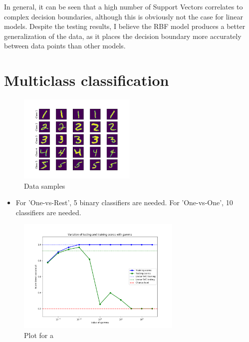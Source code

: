 \documentclass[a4paper]{article}
\begin{document}
In general, it can be seen that a high number of Support Vectors correlates to complex decision boundaries, although this is obviously not the case for linear models.  Despite the testing results, I believe the RBF model produces a better generalization of the data, as it places the decision boundary more accurately between data points than other models.
\clearpage

\section{Multiclass classification}
\begin{figure}[h]
  \begin{center}
    \includegraphics[width=0.5\textwidth]{3.png}
    \caption{Data samples}
  \end{center}
\end{figure}
\begin{itemize}
  \item For 'One-vs-Rest', 5 binary classifiers are needed. For 'One-vs-One', 10 classifiers are needed.
\end{itemize}
\begin{figure}[h]
  \begin{center}
    \includegraphics[width=0.7\textwidth]{3_a.png}
    \caption{Plot for a}
  \end{center}
\end{figure}
\end{document}
